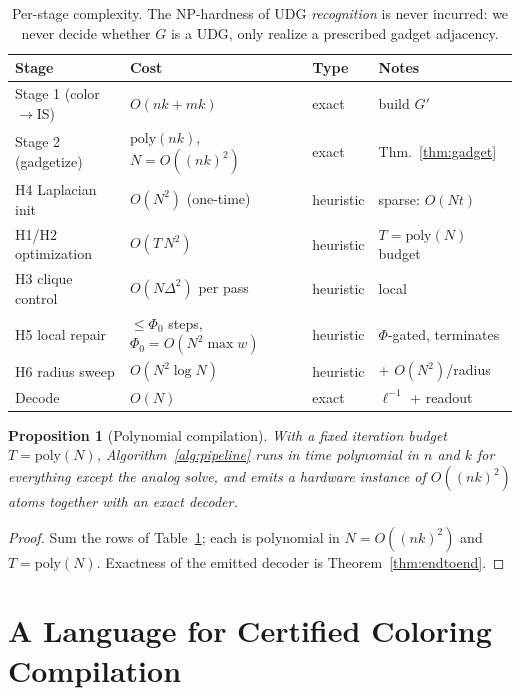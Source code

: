 \documentclass[11pt]{article}
\newtheorem{proposition}[theorem]{Proposition}
\theoremstyle{definition}
\theoremstyle{remark}
\begin{document}
\begin{table}[h]
\centering
\begin{tabular}{@{}llll@{}}
\toprule
Stage & Cost & Type & Notes \\
\midrule
Stage 1 (color$\to$IS) & $O(nk+mk)$ & exact & build $G'$ \\
Stage 2 (gadgetize)    & $\mathrm{poly}(nk)$, $N=O((nk)^2)$ & exact & Thm.~\ref{thm:gadget} \\
H4 Laplacian init      & $O(N^2)$ (one-time) & heuristic & sparse: $O(Nt)$ \\
H1/H2 optimization     & $O(T\,N^2)$ & heuristic & $T=\mathrm{poly}(N)$ budget \\
H3 clique control      & $O(N\Delta^2)$ per pass & heuristic & local \\
H5 local repair        & $\le \Phi_0$ steps, $\Phi_0=O(N^2\max w)$ & heuristic & $\Phi$-gated, terminates \\
H6 radius sweep        & $O(N^2\log N)$ & heuristic & + $O(N^2)$/radius \\
Decode                 & $O(N)$ & exact & $\ell^{-1}$ + readout \\
\bottomrule
\end{tabular}
\caption{Per-stage complexity. The NP-hardness of UDG \emph{recognition}
\cite{Breu1998} is never incurred: we never decide whether $G$ is a UDG, only realize a
prescribed gadget adjacency.}
\label{tab:complexity}
\end{table}

\begin{proposition}[Polynomial compilation]
With a fixed iteration budget $T=\mathrm{poly}(N)$, Algorithm~\ref{alg:pipeline} runs in
time polynomial in $n$ and $k$ for everything except the analog solve, and emits a
hardware instance of $O((nk)^2)$ atoms together with an exact decoder.
\end{proposition}

\begin{proof}
Sum the rows of Table~\ref{tab:complexity}; each is polynomial in $N=O((nk)^2)$ and
$T=\mathrm{poly}(N)$. Exactness of the emitted decoder is Theorem~\ref{thm:endtoend}.
\end{proof}

\section{A Language for Certified Coloring Compilation}
\label{sec:language}
\end{document}
